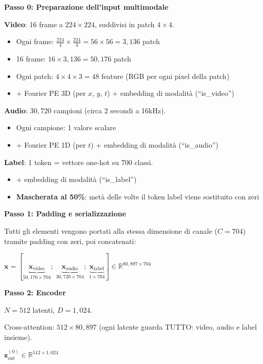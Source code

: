 \documentclass[12pt,a4paper]{article}
\begin{document}
\begin{examplebox}
\textbf{Passo 0: Preparazione dell'input multimodale}

\textbf{Video}: 16 frame a $224 \times 224$, suddivisi in patch $4 \times 4$.
\begin{itemize}
    \item Ogni frame: $\frac{224}{4} \times \frac{224}{4} = 56 \times 56 = 3{,}136$ patch
    \item 16 frame: $16 \times 3{,}136 = 50{,}176$ patch
    \item Ogni patch: $4 \times 4 \times 3 = 48$ feature (RGB per ogni pixel della patch)
    \item + Fourier PE 3D (per $x$, $y$, $t$) + embedding di modalit\`a (``is\_video'')
\end{itemize}

\textbf{Audio}: $30{,}720$ campioni (circa 2 secondi a 16kHz).
\begin{itemize}
    \item Ogni campione: 1 valore scalare
    \item + Fourier PE 1D (per $t$) + embedding di modalit\`a (``is\_audio'')
\end{itemize}

\textbf{Label}: 1 token = vettore one-hot su 700 classi.
\begin{itemize}
    \item + embedding di modalit\`a (``is\_label'')
    \item \textbf{Mascherata al 50\%}: met\`a delle volte il token label viene sostituito con zeri
\end{itemize}

\textbf{Passo 1: Padding e serializzazione}

Tutti gli elementi vengono portati alla stessa dimensione di canale ($C = 704$) tramite padding con zeri, poi concatenati:

$\mathbf{x} = [\underbrace{\mathbf{x}_{\text{video}}}_{50{,}176 \times 704}; \; \underbrace{\mathbf{x}_{\text{audio}}}_{30{,}720 \times 704}; \; \underbrace{\mathbf{x}_{\text{label}}}_{1 \times 704}] \in \mathbb{R}^{80{,}897 \times 704}$

\textbf{Passo 2: Encoder}

$N = 512$ latenti, $D = 1{,}024$.

Cross-attention: $512 \times 80{,}897$ (ogni latente guarda TUTTO: video, audio e label insieme).

$\mathbf{z}^{(0)}_{\text{out}} \in \mathbb{R}^{512 \times 1{,}024}$


\end{examplebox}
\end{document}
